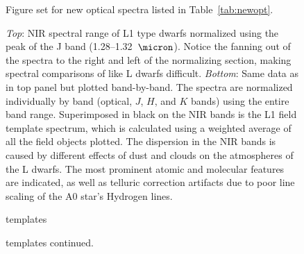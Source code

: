 \documentclass[12pt,preprint]{aastex}
\begin{document}
\begin{figure}
		\caption{Figure set for new optical spectra listed in Table~\ref{tab:newopt}.}
	\label{fig:newopt}
\end{figure}



\begin{figure}
	\caption{\emph{Top}: NIR spectral range of L1 type dwarfs normalized using the peak of the J band (1.28--1.32~$\micron$). Notice the fanning out of the spectra to the right and left of the normalizing section, making spectral comparisons of like L dwarfs difficult. \emph{Bottom}: Same data as in top panel but plotted band-by-band. The spectra are normalized individually by band (optical, $J$, $H$, and $K$ bands) using the entire band range. Superimposed in black on the NIR bands is the L1 field template spectrum, which is calculated using a weighted average of all the field objects plotted. The dispersion in the NIR bands is caused by different effects of dust and clouds on the atmospheres of the L dwarfs. The most prominent atomic and molecular features are indicated, as well as telluric correction artifacts due to poor line scaling of the A0 star's Hydrogen lines.}
	\label{fig:L1fan}
\end{figure}




\begin{figure}
	\caption{templates}
	\label{fig:field_templates}
\end{figure}

\begin{figure}
	\caption{templates continued.}
\end{figure}
\end{document}
